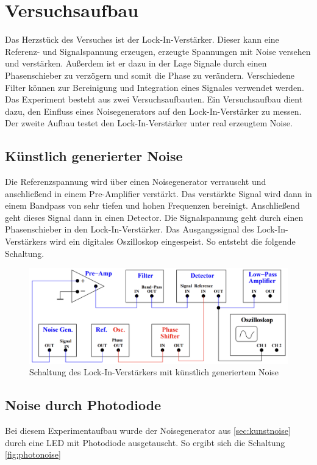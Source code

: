 %

%
\section{Versuchsaufbau}
Das Herzstück des Versuches ist der Lock-In-Verstärker. Dieser kann eine Referenz- und Signalspannung erzeugen, erzeugte Spannungen mit 
Noise versehen und verstärken. Außerdem ist er dazu in der Lage Signale durch einen Phasenschieber zu verzögern und somit die Phase zu 
verändern. Verschiedene Filter können zur Bereinigung und Integration eines Signales verwendet werden.\\
\noindent
Das Experiment besteht aus zwei Versuchsaufbauten. 
Ein Versuchsaufbau dient dazu, den Einfluss eines Noisegenerators auf den Lock-In-Verstärker zu messen. Der zweite Aufbau testet 
den Lock-In-Verstärker unter real erzeugtem Noise.

\subsection{Künstlich generierter Noise}
\label{sec:kunstnoise}
Die Referenzspannung wird über einen Noisegenerator verrauscht und anschließend in einem Pre-Amplifier verstärkt. Das verstärkte Signal 
wird dann in einem Bandpass von sehr tiefen und hohen Frequenzen bereinigt. Anschließend geht dieses Signal dann in einen Detector.
Die Signalspannung geht durch einen Phasenschieber in den Lock-In-Verstärker. Das Ausgangssignal des Lock-In-Verstärkers wird ein digitales 
Oszilloskop eingespeist. So entsteht die folgende Schaltung.

\begin{figure}[H]
    \includegraphics[width=\textwidth]{./content/Schaltung_kunstliche.png}
    \caption{Schaltung des Lock-In-Verstärkers mit künstlich generiertem Noise \cite{Versuchsanleitung_v303}}
    \label{fig:kunstnoise}
\end{figure}

\subsection{Noise durch Photodiode}
\noindent
Bei diesem Experimentaufbau wurde der Noisegenerator aus \autoref{sec:kunstnoise} durch eine LED mit Photodiode ausgetauscht. So ergibt sich 
die Schaltung \ref{fig:photonoise}


